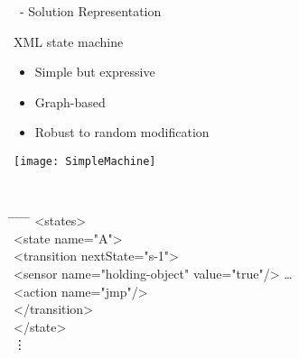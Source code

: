 
\begin{slide}{\ECS~- Solution Representation}
  \begin{minipage}{.65\textwidth}
    \SWEEP XML state machine
    \begin{itemize}
    \item Simple but expressive
    \item Graph-based
    \item Robust to random modification
    \end{itemize}
  \end{minipage}
  \hfill 
  \begin{minipage}{.3\textwidth}
    \texttt{[image: SimpleMachine]}
  \end{minipage}\\
  \bigskip
  \bigskip
  \centering
  \begin{minipage}{.35\textwidth}
    \ttfamily
    \tiny
    \begin{tabbing}
      \hspace{1ex} \= \hspace{1ex} \= \hspace{1ex} \= \hspace{1ex} \= \hspace{2ex} \= \kill
      <states> \\
      \> <state name="A"> \\
      \> \> <transition nextState="s-1"> \\
      \> \> \> <sensor name="holding-object" value="true"/> \ldots \\
      \> \> \> <action name="jmp"/> \\
      \> \> </transition> \\
      \> </state> \\
      \> \vdots \\
    \end{tabbing}
  \end{minipage}
\end{slide}


